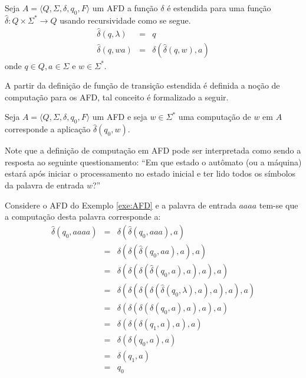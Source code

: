 \begin{definition}\label{def:DeltaEstendido}
	Seja $A = \langle Q, \Sigma, \delta, q_0, F\rangle$ um AFD a função $\delta$ é estendida para uma função $\widehat{\delta}: Q \times \Sigma^* \rightarrow Q$ usando recursividade como se segue.
	\begin{eqnarray}\label{eq:ExtensaoDaFuncaoTransicaoDelta}
		\widehat{\delta}(q, \lambda)& = & q \\
		\widehat{\delta}(q, wa)& = & \delta(\widehat{\delta}(q, w), a)	
	\end{eqnarray}
	onde $q \in Q, a \in \Sigma$ e $w \in \Sigma^*$.
\end{definition}

A partir da definição de função de transição estendida é definida  a noção de computação para os AFD, tal conceito é formalizado a seguir.

\begin{definition}\label{def:ComputacaoAFD}
	Seja $A = \langle Q, \Sigma, \delta, q_0, F\rangle$ um AFD e seja $w \in \Sigma^*$ uma computação de $w$ em $A$ corresponde a aplicação $\widehat{\delta}(q_0, w)$.
\end{definition}

Note que a definição de computação em AFD pode ser interpretada como sendo a resposta ao seguinte questionamento: ``Em que estado o autômato (ou a máquina) estará após iniciar o processamento no estado inicial e ter lido todos os símbolos da palavra de entrada $w$?''

\begin{exem}\label{exe:ComputacaoAFD1}
	Considere o AFD do Exemplo \ref{exe:AFD} e a palavra de entrada $aaaa$ tem-se que a computação desta palavra corresponde a:
	\begin{eqnarray*}
		\widehat{\delta}(q_0, aaaa) & = & \delta(\widehat{\delta}(q_0, aaa), a)\\
		& = & \delta(\delta(\widehat{\delta}(q_0, aa), a), a)\\
		& = & \delta(\delta(\delta(\widehat{\delta}(q_0, a), a), a), a)\\
		& = & \delta(\delta(\delta(\delta(\widehat{\delta}(q_0, \lambda), a), a), a), a)\\
		& = & \delta(\delta(\delta(\delta(q_0, a), a), a), a)\\
		& = & \delta(\delta(\delta(q_1, a), a), a)\\
		& = & \delta(\delta(q_0, a), a)\\
		& = & \delta(q_1, a)\\
		& = & q_0
	\end{eqnarray*}
\end{exem}

